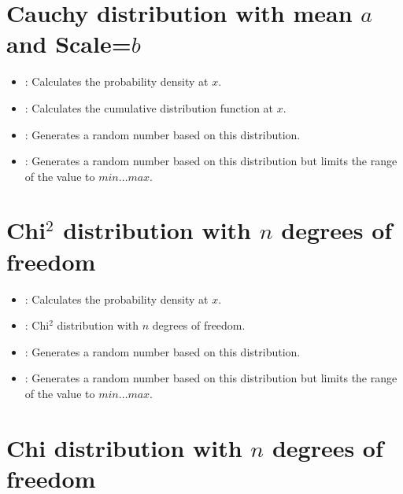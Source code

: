 \section{Cauchy distribution with mean \texorpdfstring{$a$}{a} and Scale=\texorpdfstring{$b$}{b}}

\begin{itemize}

\item
{}:
Calculates the probability density at $x$.

\item
{}:
Calculates the cumulative distribution function at $x$.

\item
{}:
Generates a random number based on this distribution.

\item
{}:
Generates a random number based on this distribution but limits the range of the value to $min\ldots max$.

\end{itemize}



\section{\texorpdfstring{Chi$^2$}{Chi2} distribution with \texorpdfstring{$n$}{n} degrees of freedom}

\begin{itemize}

\item
{}:
Calculates the probability density at $x$.

\item
{}:
Chi$^2$ distribution with $n$ degrees of freedom.

\item
{}:
Generates a random number based on this distribution.

\item
{}:
Generates a random number based on this distribution but limits the range of the value to $min\ldots max$.

\end{itemize}



\section{Chi distribution with \texorpdfstring{$n$}{n} degrees of freedom}

